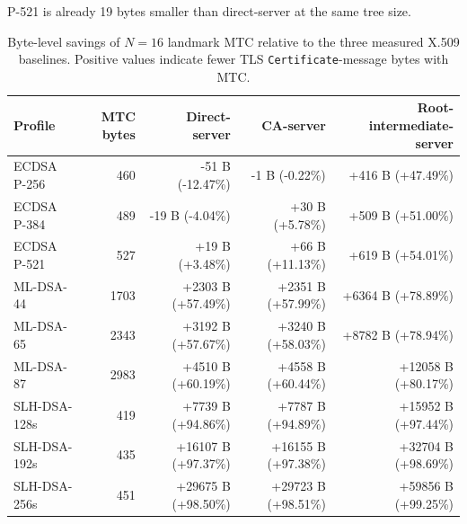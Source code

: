 \documentclass[journal]{IEEEtran}
\begin{document}
P-521 is already 19 bytes smaller than direct-server at the same tree size.



\begin{table}[t]

\centering

\caption{Byte-level savings of $N=16$ landmark MTC relative to the three measured X.509 baselines. Positive values indicate fewer TLS \texttt{Certificate}-message bytes with MTC.}

\label{tab:mtc-chain-depth-savings}

\begin{tabular}{lrrrr}

\toprule

\textbf{Profile} & \textbf{MTC bytes} & \textbf{Direct-server} & \textbf{CA-server} & \textbf{Root-intermediate-server} \\

\midrule

ECDSA P-256  & 460  & -51 B (-12.47\%) & -1 B (-0.22\%)   & +416 B (+47.49\%) \\

ECDSA P-384  & 489  & -19 B (-4.04\%)  & +30 B (+5.78\%)  & +509 B (+51.00\%) \\

ECDSA P-521  & 527  & +19 B (+3.48\%)  & +66 B (+11.13\%) & +619 B (+54.01\%) \\

ML-DSA-44    & 1703 & +2303 B (+57.49\%) & +2351 B (+57.99\%) & +6364 B (+78.89\%) \\

ML-DSA-65    & 2343 & +3192 B (+57.67\%) & +3240 B (+58.03\%) & +8782 B (+78.94\%) \\

ML-DSA-87    & 2983 & +4510 B (+60.19\%) & +4558 B (+60.44\%) & +12058 B (+80.17\%) \\

SLH-DSA-128s & 419  & +7739 B (+94.86\%) & +7787 B (+94.89\%) & +15952 B (+97.44\%) \\

SLH-DSA-192s & 435  & +16107 B (+97.37\%) & +16155 B (+97.38\%) & +32704 B (+98.69\%) \\

SLH-DSA-256s & 451  & +29675 B (+98.50\%) & +29723 B (+98.51\%) & +59856 B (+99.25\%) \\

\bottomrule

\end{tabular}

\end{table}
\end{document}
